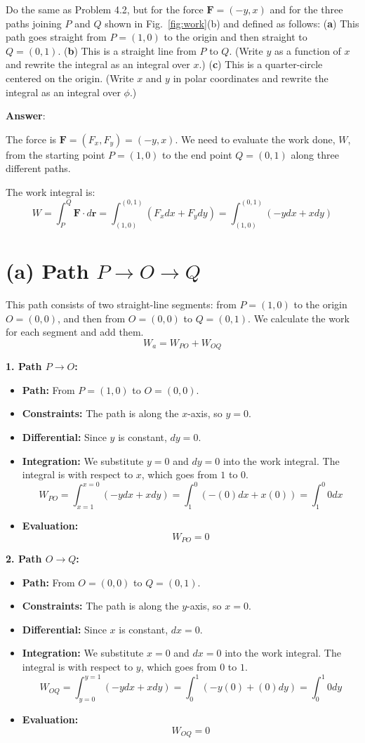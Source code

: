 \documentclass[11pt, a4paper]{article} %
\begin{document}
Do the same as Problem 4.2, but for the force $\mathbf{F} = (-y, x)$ and for the three paths joining $P$ and $Q$ shown in Fig.~\ref{fig:work}(b) and defined as follows: (\textbf{a}) This path goes straight from $P = (1, 0)$ to the origin and then straight to $Q = (0,1)$. (\textbf{b}) This is a straight line from $P$ to $Q$. (Write $y$ as a function of $x$ and rewrite the integral as an integral over $x$.) (\textbf{c}) This is a quarter-circle centered on the origin. (Write $x$ and $y$ in polar coordinates and rewrite the integral as an integral over $\phi$.)

\textbf{Answer}:

The force is $\mathbf{F} = (F_x, F_y) = (-y, x)$. We need to evaluate the work done, $W$, from the starting point $P = (1, 0)$ to the end point $Q = (0, 1)$ along three different paths.

The work integral is:
$$W = \int_P^Q \mathbf{F} \cdot d\mathbf{r} = \int_{(1,0)}^{(0,1)} (F_x dx + F_y dy) = \int_{(1,0)}^{(0,1)} (-y dx + x dy)$$

\hrulefill

\section*{(a) Path $P \to O \to Q$}

This path consists of two straight-line segments: from $P=(1,0)$ to the origin $O=(0,0)$, and then from $O=(0,0)$ to $Q=(0,1)$. We calculate the work for each segment and add them.
$$W_a = W_{PO} + W_{OQ}$$

\textbf{1. Path $P \to O$:}
\begin{itemize}
    \item \textbf{Path:} From $P=(1,0)$ to $O=(0,0)$.
    \item \textbf{Constraints:} The path is along the $x$-axis, so $y=0$.
    \item \textbf{Differential:} Since $y$ is constant, $dy = 0$.
    \item \textbf{Integration:} We substitute $y=0$ and $dy=0$ into the work integral. The integral is with respect to $x$, which goes from $1$ to $0$.
    $$W_{PO} = \int_{x=1}^{x=0} (-y dx + x dy) = \int_1^0 (-(0) dx + x(0)) = \int_1^0 0 dx$$
    \item \textbf{Evaluation:}
    $$W_{PO} = 0$$
\end{itemize}

\textbf{2. Path $O \to Q$:}
\begin{itemize}
    \item \textbf{Path:} From $O=(0,0)$ to $Q=(0,1)$.
    \item \textbf{Constraints:} The path is along the $y$-axis, so $x=0$.
    \item \textbf{Differential:} Since $x$ is constant, $dx = 0$.
    \item \textbf{Integration:} We substitute $x=0$ and $dx=0$ into the work integral. The integral is with respect to $y$, which goes from $0$ to $1$.
    $$W_{OQ} = \int_{y=0}^{y=1} (-y dx + x dy) = \int_0^1 (-y(0) + (0)dy) = \int_0^1 0 dy$$
    \item \textbf{Evaluation:}
    $$W_{OQ} = 0$$
\end{itemize}
\end{document}
